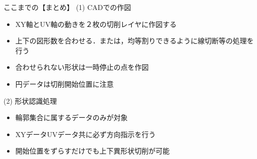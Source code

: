 \vspace*{3zh}
\begin{itembox}[l]{ここまでの【まとめ】}
(1) CADでの作図
\begin{itemize}
\item XY軸とUV軸の動きを２枚の切削レイヤに作図する
\item 上下の図形数を合わせる．または，均等割りできるように線切断等の処理を行う
\item 合わせられない形状は一時停止の点を作図
\item 円データは切削開始位置に注意
\end{itemize}
(2) 形状認識処理
\begin{itemize}
\item 輪郭集合に属するデータのみが対象
\item XYデータUVデータ共に必ず方向指示を行う
\item 開始位置をずらすだけでも上下異形状切削が可能
\end{itemize}
\end{itembox}
